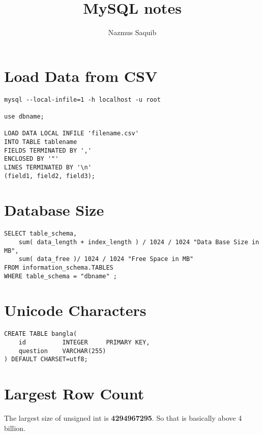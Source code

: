 \documentclass[12pt, a4paper]{article}
\begin{document}
\title{MySQL notes}
\author{Nazmus Saquib}

\maketitle
\tableofcontents

\section{Load Data from CSV}
\begin{verbatim}
mysql --local-infile=1 -h localhost -u root

use dbname;

LOAD DATA LOCAL INFILE 'filename.csv'
INTO TABLE tablename
FIELDS TERMINATED BY ','
ENCLOSED BY '"'
LINES TERMINATED BY '\n'
(field1, field2, field3);
\end{verbatim}

\section{Database Size}
\begin{verbatim}
SELECT table_schema,
    sum( data_length + index_length ) / 1024 / 1024 "Data Base Size in MB",
    sum( data_free )/ 1024 / 1024 "Free Space in MB"
FROM information_schema.TABLES
WHERE table_schema = "dbname" ; 
\end{verbatim}

\section{Unicode Characters}
\begin{verbatim}
CREATE TABLE bangla(
    id          INTEGER     PRIMARY KEY,
    question    VARCHAR(255)
) DEFAULT CHARSET=utf8;
\end{verbatim}

\section{Largest Row Count}
The largest size of unsigned int is \textbf{4294967295}.
So that is basically above 4 billion.
\end{document}
